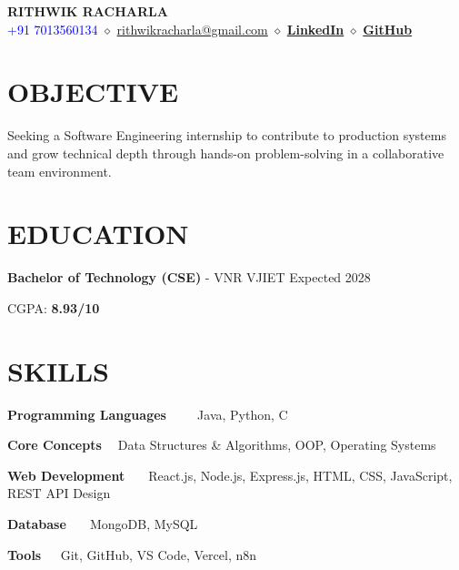 \documentclass[letterpaper,11pt]{article}
\begin{document}
\begin{center}

{\Huge \textbf{RITHWIK RACHARLA}} \\[6pt]

\textcolor{blue}{+91 7013560134} \quad $\diamond$ \quad
\textcolor{blue}{\href{mailto:rithwikracharla7@gmail.com}{rithwikracharla@gmail.com}} \quad $\diamond$ \quad
\textcolor{blue}{\href{https://www.linkedin.com/in/rithwik-racharla-488064211}{\textbf{LinkedIn}}} \quad $\diamond$ \quad
\textcolor{blue}{\href{https://github.com/Rithwik007}{\textbf{GitHub}}}

\end{center}

\section*{OBJECTIVE}

\noindent Seeking a Software Engineering internship to contribute to production systems and grow technical depth through hands-on problem-solving in a collaborative team environment.

\section*{EDUCATION}

\noindent \textbf{Bachelor of Technology (CSE)} - VNR VJIET \hfill Expected 2028

\noindent CGPA: \textbf{8.93/10}

\section*{SKILLS}


\noindent \textbf{Programming Languages \quad \quad \ \ \ }  Java, Python, C 

\noindent \textbf{Core Concepts \quad \quad \quad \quad \ \quad \quad \quad}   Data Structures \& Algorithms, OOP, Operating Systems

\noindent \textbf{Web Development \ \ \quad \quad \quad \quad \quad}  React.js, Node.js, Express.js, HTML, CSS, JavaScript, REST API Design 

\noindent \textbf{Database \ \ \quad \quad \quad \quad \quad \quad \quad \quad \quad} MongoDB, MySQL

\noindent \textbf{Tools \quad \quad \quad \quad \quad \quad \quad \quad \quad \quad \ \quad \ }Git, GitHub, VS Code, Vercel, n8n
\end{document}
